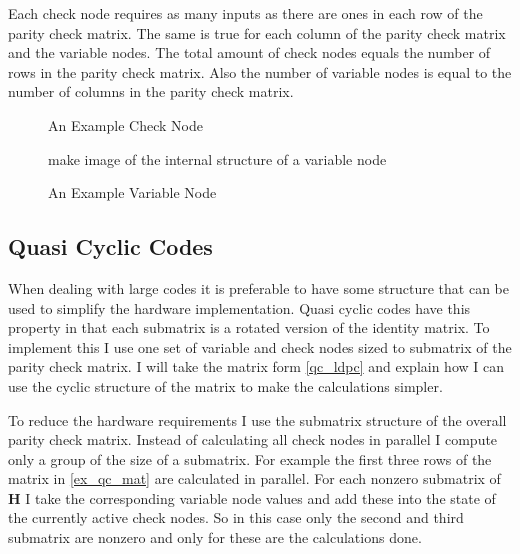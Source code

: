 Each check node requires as many inputs as there are ones in each row of the parity check matrix. The same is true for each column of the parity check matrix and the variable nodes. The total amount of check nodes equals the number of rows in the parity check matrix. Also the number of variable nodes is equal to the number of columns in the parity check matrix.

\begin{figure}
    \centering
    \caption{An Example Check Node}
\end{figure}

\begin{figure}
    make image of the internal structure of a variable node
    \centering
    \caption{An Example Variable Node}
\end{figure}

\subsection{Quasi Cyclic Codes}
When dealing with large codes it is preferable to have some structure that can be used to simplify the hardware implementation. Quasi cyclic codes have this property in that each submatrix is a rotated  version of the identity matrix. To implement this I use one set of variable and check nodes sized to submatrix of the parity check matrix. I will take the matrix form \cref{qc_ldpc} and explain how I can use the cyclic structure of the matrix to make the calculations simpler.

To reduce the hardware requirements I use the submatrix structure of the overall parity check matrix. Instead of calculating all check nodes in parallel I compute only a group of the size of a submatrix. For example the first three rows of the matrix in \cref{ex_qc_mat} are calculated in parallel. For each nonzero submatrix of $\bm{H}$ I take the corresponding variable node values and add these into the state of the currently active check nodes. So in this case only the second and third submatrix are nonzero and only for these are the calculations done. 

